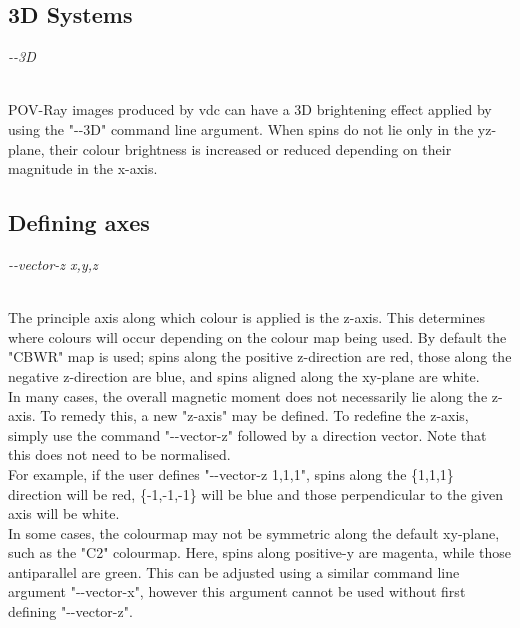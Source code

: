 \subsection*{3D Systems}

\begin{minipage}[c]{\textwidth}
\centering
\textit{-{}-3D}
\end{minipage}\\

POV-Ray images produced by vdc can have a 3D brightening effect applied by using the "-{}-3D" command line argument. When spins do not lie only in the yz-plane, their colour brightness is increased or reduced depending on their magnitude in the x-axis. \\

\subsection*{Defining axes}

\begin{minipage}[c]{\textwidth}
\centering
\textit{-{}-vector-z x,y,z}
\end{minipage}\\

The principle axis along which colour is applied is the z-axis. This determines where colours will occur depending on the colour map being used. By default the "CBWR" map is used; spins along the positive z-direction are red, those along the negative z-direction are blue, and spins aligned along the xy-plane are white.\\

In many cases, the overall magnetic moment does not necessarily lie along the z-axis. To remedy this, a new "z-axis" may be defined. To redefine the z-axis, simply use the command "-{}-vector-z" followed by a direction vector. Note that this does not need to be normalised.\\

For example, if the user defines "-{}-vector-z 1,1,1", spins along the \{1,1,1\} direction will be red, \{-1,-1,-1\} will be blue and those perpendicular to the given axis will be white.\\

In some cases, the colourmap may not be symmetric along the default xy-plane, such as the "C2" colourmap. Here, spins along positive-y are magenta, while those antiparallel are green. This can be adjusted using a similar command line argument "-{}-vector-x", however this argument cannot be used without first defining "-{}-vector-z". \\

